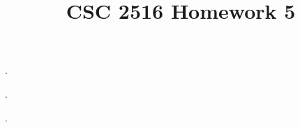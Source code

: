 \documentclass{myhw}
\title{CSC 2516 Homework 5}
\begin{document}
\begin{homeworkProblem}
.
\begin{homeworkSection}
\end{homeworkSection}
\begin{homeworkSection}
\end{homeworkSection}
\begin{homeworkSection}
\end{homeworkSection}
\end{homeworkProblem}


\begin{homeworkProblem}
.
\begin{homeworkSection}
\end{homeworkSection}
\begin{homeworkSection}
\end{homeworkSection}
\begin{homeworkSection}
\end{homeworkSection}
\end{homeworkProblem}


\begin{homeworkProblem}
.
\begin{homeworkSection}
\end{homeworkSection}
\begin{homeworkSection}
\end{homeworkSection}
\begin{homeworkSection}
\end{homeworkSection}
\end{homeworkProblem}
\end{document}
